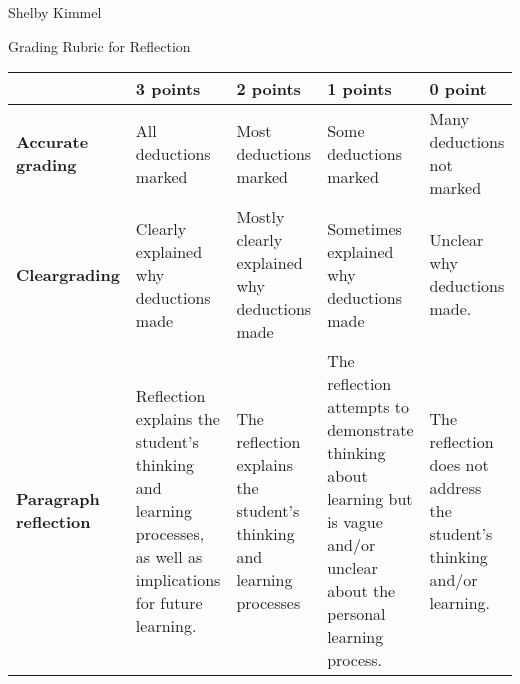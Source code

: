 \documentclass[12pt,landscape]{article}
\begin{document}
\hfill Shelby Kimmel

\begin{center}
{\huge Grading Rubric for Reflection}
\end{center}



{\renewcommand{\arraystretch}{2}
\begin{tabular}{|p{2.3cm}|p{4.2cm}|p{4.2cm}|p{4.2cm}|p{4.2cm}|}
\hline
 & {\bf 3 points} & {\bf 2 points} & {\bf 1 points} & {\bf 0 point} \\
\hline
{\bf Accurate grading }& 
 All deductions marked & 
 Most deductions marked& 
 Some deductions marked & 
 Many deductions not marked\\
\hline
{\bf Clear\newline grading }& 
Clearly explained why deductions made & 
Mostly clearly explained why deductions made & 
Sometimes explained why deductions made & 
Unclear why deductions made.\\
\hline
{\bf Paragraph reflection}&
Reflection explains the student's thinking and learning processes, as well as implications for future learning.& 
The reflection explains the student's thinking and learning processes&
The reflection attempts to demonstrate thinking about learning but is vague and/or unclear about the personal learning process.&
The reflection does not address the student's thinking and/or learning.\\
\hline
 \end{tabular}
}
\end{document}
